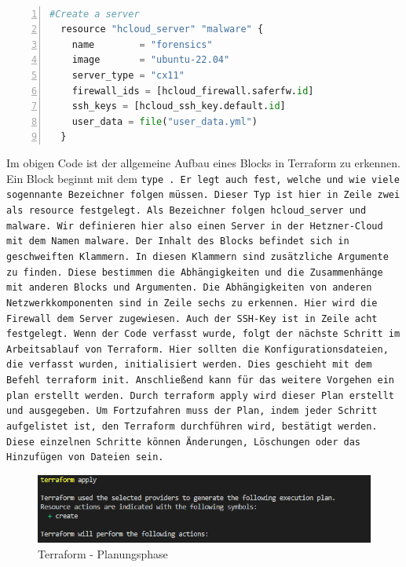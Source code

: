 \begin{otherlanguage}{ngerman}
\tt  
\begin{lstlisting}[caption = Block in HCL - Syntax, language=python, numbers=left, numberstyle=\tiny]
  #Create a server
  resource "hcloud_server" "malware" {
    name        = "forensics"
    image       = "ubuntu-22.04"
    server_type = "cx11"
    firewall_ids = [hcloud_firewall.saferfw.id]
    ssh_keys = [hcloud_ssh_key.default.id]
    user_data = file("user_data.yml")
  }
\end{lstlisting}
\rm
\newline
\newline
Im obigen Code ist der allgemeine Aufbau eines Blocks in Terraform zu erkennen. Ein Block beginnt mit dem \tt type \rm . Er legt auch fest, welche und wie viele sogennante Bezeichner folgen müssen. Dieser Typ ist hier in Zeile zwei als \dq resource \dq{} festgelegt. Als Bezeichner folgen \dq hcloud\_server \dq{} und \dq malware\dq{}. Wir definieren hier also einen Server in der Hetzner-Cloud mit dem Namen \dq malware\dq{}. Der Inhalt des Blocks befindet sich in geschweiften Klammern. In diesen Klammern sind zusätzliche Argumente zu finden. Diese bestimmen die Abhängigkeiten und die Zusammenhänge mit anderen Blocks und Argumenten. Die Abhängigkeiten von anderen Netzwerkkomponenten sind in Zeile sechs zu erkennen. Hier wird die Firewall dem Server zugewiesen. Auch der SSH-Key ist in Zeile acht festgelegt.
\newline
Wenn der Code verfasst wurde, folgt der nächste Schritt im Arbeitsablauf von Terraform. Hier sollten die Konfigurationsdateien, die verfasst wurden, initialisiert werden. Dies geschieht mit dem Befehl \tt terraform init\rm. Anschließend kann für das weitere Vorgehen ein plan erstellt werden. Durch \tt terraform apply \rm wird dieser Plan erstellt und ausgegeben. Um Fortzufahren muss der Plan, indem jeder Schritt aufgelistet ist, den Terraform durchführen wird, bestätigt werden. Diese einzelnen Schritte können Änderungen, Löschungen oder das Hinzufügen von Dateien sein.
\newline
\begin{figure}[h]
    \centering
    \includegraphics{LaTeX/graphic/terraformapply.png}
    \caption{Terraform - Planungsphase}
\end{figure}
\newline 
 

\end{otherlanguage}
